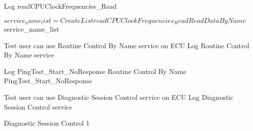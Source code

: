 \begin{robotcode}
    Log    readCPUClockFrequencies_Read

    ${service_name_list}=    Create List    readCPUClockFrequencies_Read
    Read Data By Name    ${service_name_list}

Test user can use Routine Control By Name service on ECU
    Log    Routine Control By Name service

    Log    PingTest_Start_NoResponse
    Routine Control By Name    PingTest_Start_NoResponse

Test user can use Diagnostic Session Control service on ECU
    Log    Diagnostic Session Control service

    Diagnostic Session Control    1
\end{robotcode}